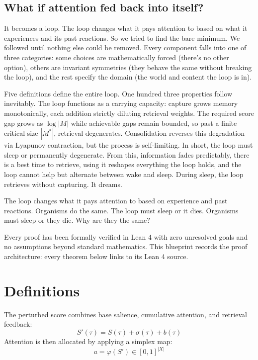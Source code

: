 
\section*{What if attention fed back into itself?}

It becomes a loop. The loop changes what it pays attention to based on what it experiences and its past reactions. So we tried to find the bare minimum. We followed until nothing else could be removed. Every component falls into one of three categories: some choices are mathematically forced (there's no other option), others are invariant symmetries (they behave the same without breaking the loop), and the rest specify the domain (the world and content the loop is in).

Five definitions define the entire loop. One hundred three properties follow inevitably. The loop functions as a carrying capacity: capture grows memory monotonically, each addition strictly diluting retrieval weights. The required score gap grows as $\log|M|$ while achievable gaps remain bounded, so past a finite critical size $|M^*|$, retrieval degenerates. Consolidation reverses this degradation via Lyapunov contraction, but the process is self-limiting. In short, the loop must sleep or permanently degenerate. From this, information fades predictably, there is a best time to retrieve, using it reshapes everything the loop holds, and the loop cannot help but alternate between wake and sleep. During sleep, the loop retrieves without capturing. It dreams.

The loop changes what it pays attention to based on experience and past reactions. Organisms do the same. The loop must sleep or it dies. Organisms must sleep or they die. Why are they the same?

Every proof has been formally verified in Lean 4 with zero unresolved goals and no assumptions beyond standard mathematics. This blueprint records the proof architecture: every theorem below links to its Lean 4 source.

\chapter{Definitions}

\begin{definition}
\label{def:observation}
\leanok
The perturbed score combines base salience, cumulative attention, and retrieval feedback:
\begin{equation}
S'(\tau) = S(\tau) + \sigma(\tau) + b(\tau)
\end{equation}
Attention is then allocated by applying a simplex map:
\begin{equation}
a = \varphi(S') \in [0,1]^{|X|}
\end{equation}
\end{definition}

